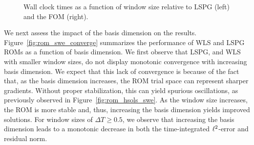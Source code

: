 \begin{figure}
\begin{center}
\begin{subfigure}[t]{0.49\textwidth}
\end{subfigure}
\caption{Wall clock times as a function of window size relative to LSPG (left) and the FOM (right).} 
\label{fig:rom_swe_timings}
\end{center}
\end{figure}

We next assess the impact of the basis dimension on the results. Figure~\ref{fig:rom_swe_converge} summarizes the performance of WLS and LSPG ROMs as a function of basis dimension. We first observe that LSPG, and WLS with smaller window sizes, do not display monotonic convergence with increasing basis dimension. 
We expect that this lack of convergence is because of the fact that, as the basis dimension increases, the ROM trial space can represent sharper gradients. Without proper stabilization, this can yield spurious oscillations, as previously observed in Figure~\ref{fig:rom_hsols_swe}. As the window size increases, the ROM is more stable and, thus, increasing the basis dimension yields improved solutions. 
For window sizes of $\Delta T \ge 0.5$, we observe that increasing the basis dimension leads to a monotonic decrease in both the time-integrated $\ell^2$-error and residual norm. 

